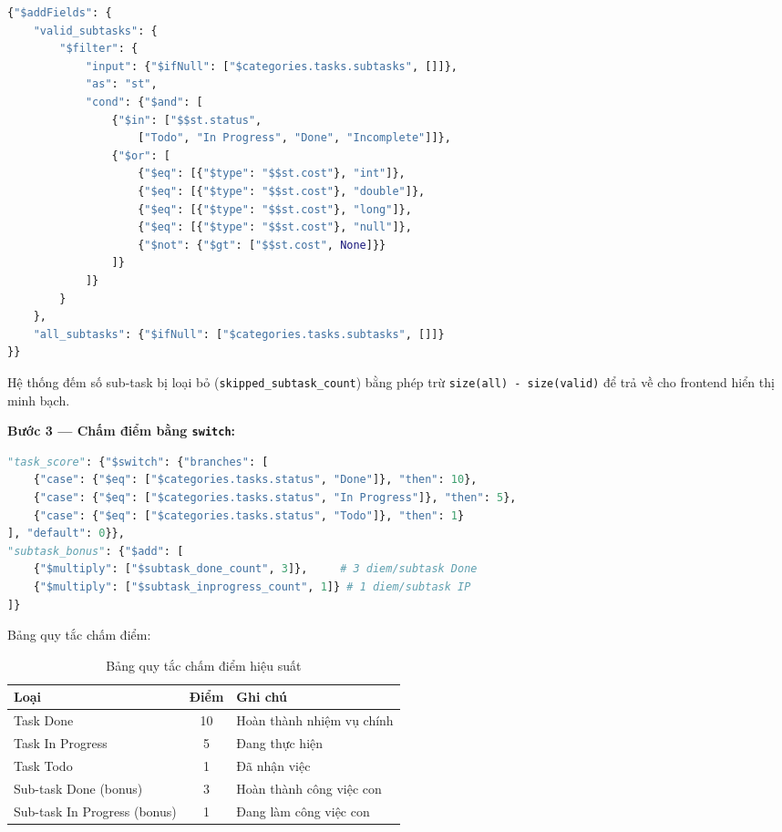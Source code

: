 \documentclass[a4paper,12pt]{article}
\begin{document}
\begin{lstlisting}[language=Python, caption=Data Cleansing --- lọc subtask hợp lệ]
{"$addFields": {
    "valid_subtasks": {
        "$filter": {
            "input": {"$ifNull": ["$categories.tasks.subtasks", []]},
            "as": "st",
            "cond": {"$and": [
                {"$in": ["$$st.status",
                    ["Todo", "In Progress", "Done", "Incomplete"]]},
                {"$or": [
                    {"$eq": [{"$type": "$$st.cost"}, "int"]},
                    {"$eq": [{"$type": "$$st.cost"}, "double"]},
                    {"$eq": [{"$type": "$$st.cost"}, "long"]},
                    {"$eq": [{"$type": "$$st.cost"}, "null"]},
                    {"$not": {"$gt": ["$$st.cost", None]}}
                ]}
            ]}
        }
    },
    "all_subtasks": {"$ifNull": ["$categories.tasks.subtasks", []]}
}}
\end{lstlisting}

Hệ thống đếm số sub-task bị loại bỏ (\texttt{skipped\_subtask\_count}) bằng phép trừ \texttt{size(all) - size(valid)} để trả về cho frontend hiển thị minh bạch.

\textbf{Bước 3 --- Chấm điểm bằng \texttt{switch}:}
\begin{lstlisting}[language=Python, caption=Bảng điểm hiệu suất]
"task_score": {"$switch": {"branches": [
    {"case": {"$eq": ["$categories.tasks.status", "Done"]}, "then": 10},
    {"case": {"$eq": ["$categories.tasks.status", "In Progress"]}, "then": 5},
    {"case": {"$eq": ["$categories.tasks.status", "Todo"]}, "then": 1}
], "default": 0}},
"subtask_bonus": {"$add": [
    {"$multiply": ["$subtask_done_count", 3]},     # 3 diem/subtask Done
    {"$multiply": ["$subtask_inprogress_count", 1]} # 1 diem/subtask IP
]}
\end{lstlisting}

Bảng quy tắc chấm điểm:
\begin{table}[H]
\centering
\begin{tabular}{|l|c|l|}
\hline
\textbf{Loại} & \textbf{Điểm} & \textbf{Ghi chú} \\ \hline
Task Done & 10 & Hoàn thành nhiệm vụ chính \\ \hline
Task In Progress & 5 & Đang thực hiện \\ \hline
Task Todo & 1 & Đã nhận việc \\ \hline
Sub-task Done (bonus) & 3 & Hoàn thành công việc con \\ \hline
Sub-task In Progress (bonus) & 1 & Đang làm công việc con \\ \hline
\end{tabular}
\caption{Bảng quy tắc chấm điểm hiệu suất}
\end{table}
\end{document}
